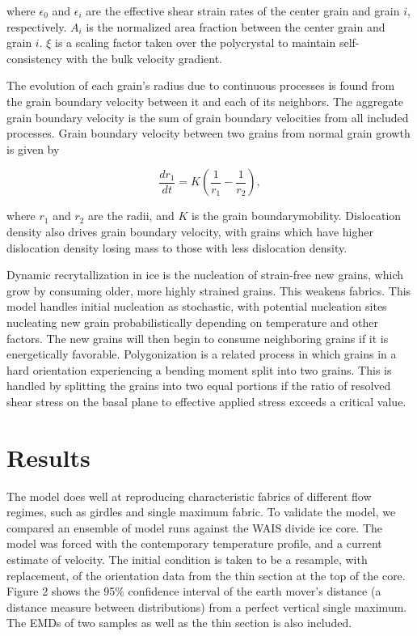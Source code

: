 \documentclass[a0,landscape]{a0poster}
\begin{document}
\begin{multicols}{3}
where $\epsilon_0$ and $\epsilon_i$ are the effective shear strain rates of the center grain and grain $i$, respectively. $A_i$ is the normalized area fraction between the center grain and grain $i$. $\xi$ is a scaling factor taken over the polycrystal to maintain self-consistency with the bulk velocity gradient. 

The evolution of each grain's radius due to continuous processes is found from the grain boundary velocity between it and each of its neighbors. The aggregate grain boundary velocity is the sum of grain boundary velocities from all included processes. Grain boundary velocity between two grains from normal grain growth is given by

\begin{equation}
\frac{dr_1}{dt} = K \left( \frac{1}{r_1}-\frac{1}{r_2} \right),
\end{equation}

where $r_1$ and $r_2$ are the radii, and $K$ is the grain boundarymobility. Dislocation density also drives grain boundary velocity, with grains which have higher dislocation density losing mass to those with less dislocation density.

Dynamic recrytallization in ice is the nucleation of strain-free new grains, which grow by consuming older, more highly strained grains. This weakens fabrics. This model handles initial nucleation as stochastic, with potential nucleation sites nucleating new grain probabilistically depending on temperature and other factors. The new grains will then begin to consume neighboring grains if it is energetically favorable. Polygonization is a related process in which grains in a hard orientation experiencing a bending moment split into two grains. This is handled by splitting the grains into two equal portions if the ratio of resolved shear stress on the basal plane to effective applied stress exceeds a critical value. 



\section*{Results}
The model does well at reproducing characteristic fabrics of different flow regimes, such as girdles and single maximum fabric. To validate the model, we compared an ensemble of model runs against the WAIS divide ice core. The model was forced with the contemporary temperature profile, and a current estimate of velocity. The initial condition is taken to be a resample, with replacement, of the orientation data from the thin section at the top of the core. Figure 2 shows the 95\% confidence interval of the earth mover's distance (a distance measure between distributions) from a perfect vertical single maximum. The EMDs of two samples as well as the thin section is also included.


\end{multicols}
\end{document}
